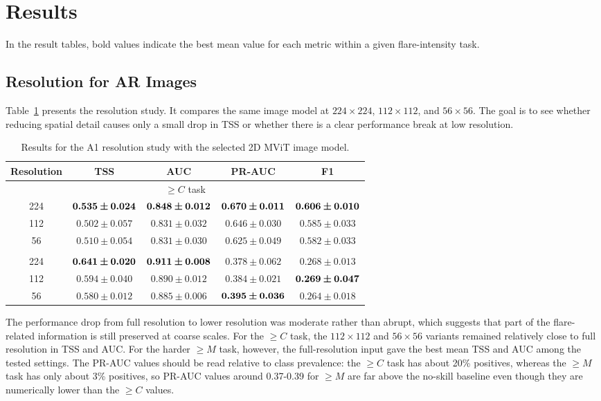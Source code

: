 \documentclass[runningheads]{llncs}
\begin{document}
\section{Results}

In the result tables, bold values indicate the best mean value for each metric within a given flare-intensity task.

\subsection{Resolution for AR Images}

Table~\ref{tab:single} presents the resolution study. It compares the same image model at $224 \times 224$, $112 \times 112$, and $56 \times 56$. The goal is to see whether reducing spatial detail causes only a small drop in TSS or whether there is a clear performance break at low resolution.

\begin{table}[H]
\caption{Results for the A1 resolution study with the selected 2D MViT image model.}
\label{tab:single}
\centering
\scriptsize
\setlength{\tabcolsep}{5pt}
\begin{tabular}{@{}ccccc@{}}
\toprule
Resolution & TSS & AUC & PR-AUC & F1 \\
\midrule
\multicolumn{5}{c}{$\geq C$ task} \\
\midrule
224 & $\bm{0.535 \pm 0.024}$ & $\bm{0.848 \pm 0.012}$ & $\bm{0.670 \pm 0.011}$ & $\bm{0.606 \pm 0.010}$ \\
112 & $0.502 \pm 0.057$ & $0.831 \pm 0.032$ & $0.646 \pm 0.030$ & $0.585 \pm 0.033$ \\
56 & $0.510 \pm 0.054$ & $0.831 \pm 0.030$ & $0.625 \pm 0.049$ & $0.582 \pm 0.033$ \\
\addlinespace
\multicolumn{5}{c}{$\geq M$ task} \\
\midrule
224 & $\bm{0.641 \pm 0.020}$ & $\bm{0.911 \pm 0.008}$ & $0.378 \pm 0.062$ & $0.268 \pm 0.013$ \\
112 & $0.594 \pm 0.040$ & $0.890 \pm 0.012$ & $0.384 \pm 0.021$ & $\bm{0.269 \pm 0.047}$ \\
56 & $0.580 \pm 0.012$ & $0.885 \pm 0.006$ & $\bm{0.395 \pm 0.036}$ & $0.264 \pm 0.018$ \\
\bottomrule
\end{tabular}
\end{table}


The performance drop from full resolution to lower resolution was moderate rather than abrupt, which suggests that part of the flare-related information is still preserved at coarse scales. For the $\geq C$ task, the $112 \times 112$ and $56 \times 56$ variants remained relatively close to full resolution in TSS and AUC. For the harder $\geq M$ task, however, the full-resolution input gave the best mean TSS and AUC among the tested settings. The PR-AUC values should be read relative to class prevalence: the $\geq C$ task has about 20\% positives, whereas the $\geq M$ task has only about 3\% positives, so PR-AUC values around 0.37-0.39 for $\geq M$ are far above the no-skill baseline even though they are numerically lower than the $\geq C$ values.
\end{document}
